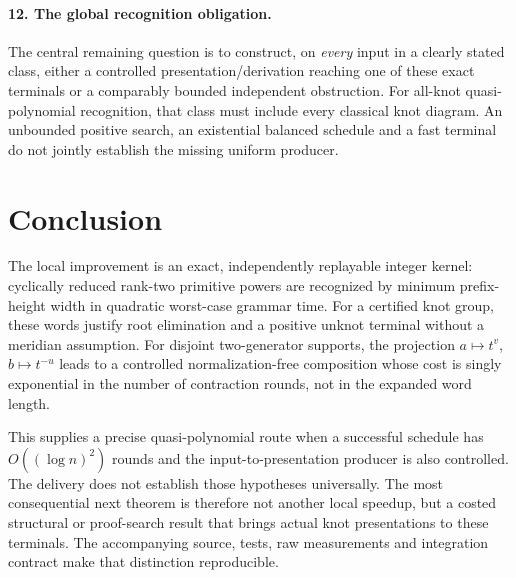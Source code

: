 \documentclass[11pt,letterpaper]{article}
\theoremstyle{definition}
\begin{document}
\paragraph{12. The global recognition obligation.}
The central remaining question is to construct, on \emph{every} input in a
clearly stated class, either a controlled presentation/derivation reaching
one of these exact terminals or a comparably bounded independent obstruction.
For all-knot quasi-polynomial recognition, that class must include every
classical knot diagram. An unbounded positive search, an existential
balanced schedule and a fast terminal do not jointly establish the missing
uniform producer.

\section{Conclusion}
The local improvement is an exact, independently replayable integer kernel:
cyclically reduced rank-two primitive powers are recognized by minimum
prefix-height width in quadratic worst-case grammar time. For a certified
knot group, these words justify root elimination and a positive unknot
terminal without a meridian assumption. For disjoint two-generator supports,
the projection $a\mapsto t^v$, $b\mapsto t^{-u}$ leads to a controlled
normalization-free composition whose cost is singly exponential in the
number of contraction rounds, not in the expanded word length.

This supplies a precise quasi-polynomial route when a successful schedule
has $O((\log n)^2)$ rounds and the input-to-presentation producer is also
controlled. The delivery does not establish those hypotheses universally.
The most consequential next theorem is therefore not another local speedup,
but a costed structural or proof-search result that brings actual knot
presentations to these terminals. The accompanying source, tests, raw
measurements and integration contract make that distinction reproducible.

\appendix
\clearpage
\end{document}
